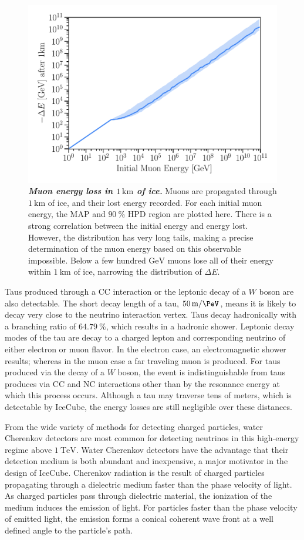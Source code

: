 \begin{figure}
	\centering
	\includegraphics[width=0.8\linewidth]{figures/muon_energy}
	\internallinenumbers
	\caption{\textbf{\textit{Muon energy loss in $\SI{1}\km$ of ice.}}
	Muons are propagated through $\SI{1}\km$ of ice, and their lost energy recorded.
	For each initial muon energy, the MAP and $\SI{90}\percent$ HPD region are plotted here.
	There is a strong correlation between the initial energy and energy lost.
	However, the distribution has very long tails, making a precise determination of the muon energy based on this observable impossible.
	Below a few hundred $\si\GeV$ muons lose all of their energy within $\SI{1}\km$ of ice, narrowing the distribution of $\Delta E$.
	}\label{fig:muon_energy}
\end{figure}

Taus produced through a CC interaction or the leptonic decay of a $W$ boson are also detectable.
The short decay length of a tau, $\SI{50}\meter / \si\PeV$, means it is likely to decay very close to the neutrino interaction vertex.
Taus decay hadronically with a branching ratio of $\SI{64.79}\percent$, which results in a hadronic shower.
Leptonic decay modes of the tau are decay to a charged lepton and corresponding neutrino of either electron or muon flavor.
In the electron case, an electromagnetic shower results; whereas in the muon case a far traveling muon is produced.
For taus produced via the decay of a $W$ boson, the event is indistinguishable from taus produces via CC and NC interactions other than by the resonance energy at which this process occurs.
Although a tau may traverse tens of meters, which is detectable by IceCube, the energy losses are still negligible over these distances.

From the wide variety of methods for detecting charged particles, water Cherenkov detectors are most common for detecting neutrinos in this high-energy regime above $\SI{1}\TeV$.
Water Cherenkov detectors have the advantage that their detection medium is both abundant and inexpensive, a major motivator in the design of IceCube.
Cherenkov radiation is the result of charged particles propagating through a dielectric medium faster than the phase velocity of light.
As charged particles pass through dielectric material, the ionization of the medium induces the emission of light.
For particles faster than the phase velocity of emitted light, the emission forms a conical coherent wave front at a well defined angle to the particle's path.

